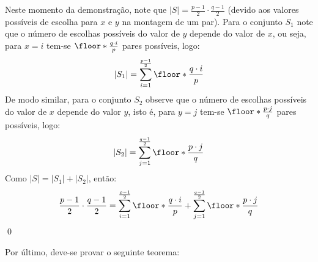 Neste momento da demonstração, note que $|S| = \frac{p-1}{2} \cdot \frac{q-1}{2}$ (devido aos valores possíveis de escolha para $x$ e $y$ na montagem de um par). Para o conjunto $S_1$ note que o número de escolhas possíveis do valor de $y$ depende do valor de $x$, ou seja, para $x = i$ tem-se $\floor*{\frac{q \cdot i}{p}}$ pares possíveis, logo:
\begin{align*}
    |S_1| = \sum_{i = 1}^{\frac{p-1}{2}} \floor*{\frac{q \cdot i}{p}}
\end{align*}
De modo similar, para o conjunto $S_2$ observe que o número de escolhas possíveis do valor de $x$ depende do valor $y$, isto é, para $y = j$ tem-se $\floor*{\frac{p\cdot j}{q}}$ pares possíveis, logo:
\begin{align*}
    |S_2| = \sum_{j = 1}^{\frac{q-1}{2}} \floor*{\frac{p \cdot j}{q}}
\end{align*}
Como $|S| = |S_1| + |S_2|$, então:
\begin{equation*}
    \frac{p-1}{2} \cdot \frac{q-1}{2} = \sum_{i = 1}^{\frac{p-1}{2}} \floor*{\frac{q \cdot i}{p}} + \sum_{j = 1}^{\frac{q-1}{2}} \floor*{\frac{p \cdot j}{q}} 
\end{equation*} \qed

Por último, deve-se provar o seguinte teorema:

